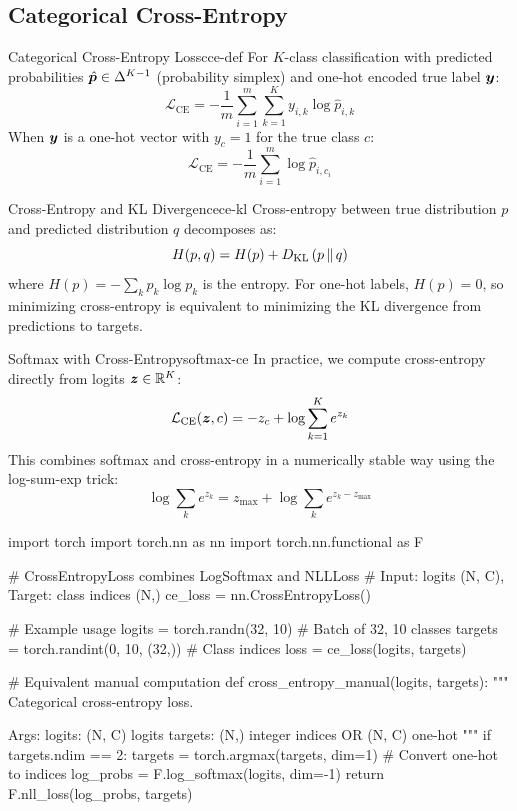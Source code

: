 \documentclass[../../main.tex]{subfiles}
\begin{document}
\subsection{Categorical Cross-Entropy}

\begin{definition}{Categorical Cross-Entropy Loss}{cce-def}
For $K$-class classification with predicted probabilities $\hat{\boldsymbol{p}} \in \Delta^{K-1}$ (probability simplex) and one-hot encoded true label $\boldsymbol{y}$:
\[
    \mathcal{L}_{\text{CE}} = -\frac{1}{m} \sum_{i=1}^{m} \sum_{k=1}^{K} y_{i,k} \log \hat{p}_{i,k}
\]
When $\boldsymbol{y}$ is a one-hot vector with $y_c = 1$ for the true class $c$:
\[
    \mathcal{L}_{\text{CE}} = -\frac{1}{m} \sum_{i=1}^{m} \log \hat{p}_{i,c_i}
\]
\end{definition}

\begin{theorem}{Cross-Entropy and KL Divergence}{ce-kl}
Cross-entropy between true distribution $p$ and predicted distribution $q$ decomposes as:
\[
    H(p, q) = H(p) + D_{\mathrm{KL}}\left( p \,\|\, q \right)
\]
where $H(p) = -\sum_k p_k \log p_k$ is the entropy. For one-hot labels, $H(p) = 0$, so minimizing cross-entropy is equivalent to minimizing the KL divergence from predictions to targets.
\end{theorem}

\begin{definition}{Softmax with Cross-Entropy}{softmax-ce}
In practice, we compute cross-entropy directly from logits $\boldsymbol{z} \in \mathbb{R}^K$:
\[
    \mathcal{L}_{\text{CE}}(\boldsymbol{z}, c) = -z_c + \log \sum_{k=1}^{K} e^{z_k}
\]
This combines softmax and cross-entropy in a numerically stable way using the log-sum-exp trick:
\[
    \log \sum_k e^{z_k} = z_{\max} + \log \sum_k e^{z_k - z_{\max}}
\]
\end{definition}

\begin{pythoncode}
import torch
import torch.nn as nn
import torch.nn.functional as F

# CrossEntropyLoss combines LogSoftmax and NLLLoss
# Input: logits (N, C), Target: class indices (N,)
ce_loss = nn.CrossEntropyLoss()

# Example usage
logits = torch.randn(32, 10)  # Batch of 32, 10 classes
targets = torch.randint(0, 10, (32,))  # Class indices
loss = ce_loss(logits, targets)

# Equivalent manual computation
def cross_entropy_manual(logits, targets):
    """
    Categorical cross-entropy loss.

    Args:
        logits: (N, C) logits
        targets: (N,) integer indices OR (N, C) one-hot
    """
    if targets.ndim == 2:
        targets = torch.argmax(targets, dim=1)  # Convert one-hot to indices
    log_probs = F.log_softmax(logits, dim=-1)
    return F.nll_loss(log_probs, targets)
\end{pythoncode}
\end{document}

